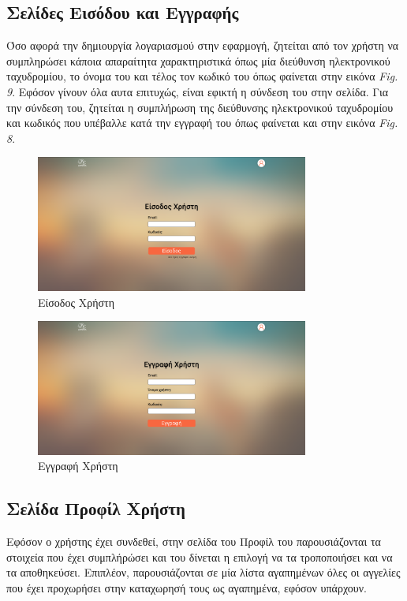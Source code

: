 \documentclass{acmart}
\begin{document}
\subsection*{Σελίδες Εισόδου και Εγγραφής}
Όσο αφορά την δημιουργία λογαριασμού στην εφαρμογή, ζητείται από τον χρήστη να συμπληρώσει κάποια απαραίτητα χαρακτηριστικά όπως μία διεύθυνση ηλεκτρονικού ταχυδρομίου, το όνομα του και τέλος τον κωδικό του όπως φαίνεται στην εικόνα \emph{Fig. 9}. Εφόσον γίνουν όλα αυτα επιτυχώς, είναι εφικτή η σύνδεση του στην σελίδα. Για την σύνδεση του, ζητείται η συμπλήρωση της διεύθυνσης ηλεκτρονικού ταχυδρομίου και κωδικός που υπέβαλλε κατά την εγγραφή του όπως φαίνεται και στην εικόνα \emph{Fig. 8}.
\begin{figure}[H]
       \includegraphics[width=0.8\textwidth]{sign_in_page.png}
       \caption{Είσοδος Χρήστη}
       \label{fig:reserve}
\end{figure}
\begin{figure}[H]
       \includegraphics[width=0.8\textwidth]{sign_up_page.png}
       \caption{Εγγραφή Χρήστη}
       \label{fig:about}
\end{figure}
\subsection*{Σελίδα Προφίλ Χρήστη}
Εφόσον ο χρήστης έχει συνδεθεί, στην σελίδα του Προφίλ του παρουσιάζονται τα στοιχεία που έχει συμπλήρώσει και του δίνεται η επιλογή να τα τροποποιήσει και να τα αποθηκεύσει. Επιπλέον, παρουσιάζονται σε μία λίστα αγαπημένων όλες οι αγγελίες που έχει προχωρήσει στην καταχωρησή τους ως αγαπημένα, εφόσον υπάρχουν.
\end{document}
